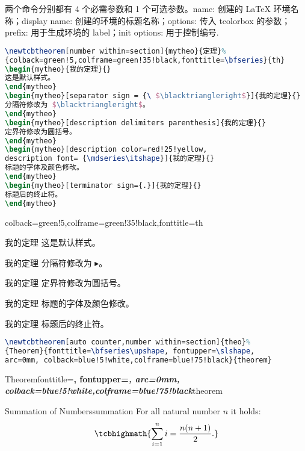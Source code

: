\documentclass{ctexart}
\begin{document}
两个命令分别都有 4 个必需参数和 1 个可选参数。name: 创建的 LaTeX 环境名称；display name: 创建的环境的标题名称；options: 传入 tcolorbox 的参数；prefix: 用于生成环境的 label；init options: 用于控制编号.
\begin{lstlisting}[language={TeX}]
\newtcbtheorem[number within=section]{mytheo}{定理}%
{colback=green!5,colframe=green!35!black,fonttitle=\bfseries}{th}
\begin{mytheo}{我的定理}{}
这是默认样式。
\end{mytheo}
\begin{mytheo}[separator sign = {\ $\blacktriangleright$}]{我的定理}{}
分隔符修改为 $\blacktriangleright$。
\end{mytheo}
\begin{mytheo}[description delimiters parenthesis]{我的定理}{}
定界符修改为圆括号。
\end{mytheo}
\begin{mytheo}[description color=red!25!yellow,
description font= {\mdseries\itshape}]{我的定理}{}
标题的字体及颜色修改。
\end{mytheo}
\begin{mytheo}[terminator sign={.}]{我的定理}{}
标题后的终止符。
\end{mytheo}
\end{lstlisting}
%
{colback=green!5,colframe=green!35!black,fonttitle=\bfseries}{th}
\begin{mytheo}{我的定理}{}
	这是默认样式。
\end{mytheo}
\begin{mytheo}[separator sign = {\ $\blacktriangleright$}]{我的定理}{}
	分隔符修改为 $\blacktriangleright$。
\end{mytheo}
\begin{mytheo}{我的定理}{}
	定界符修改为圆括号。
\end{mytheo}
\begin{mytheo}[description color=red!25!yellow,
	description font= {\mdseries\itshape}]{我的定理}{}
	标题的字体及颜色修改。
\end{mytheo}
\begin{mytheo}[terminator sign={.}]{我的定理}{}
	标题后的终止符。
\end{mytheo}
\begin{lstlisting}[language={TeX}]
\newtcbtheorem[auto counter,number within=section]{theo}%
{Theorem}{fonttitle=\bfseries\upshape, fontupper=\slshape,
arc=0mm, colback=blue!5!white,colframe=blue!75!black}{theorem}
\end{lstlisting}
%
{Theorem}{fonttitle=\bfseries\upshape, fontupper=\slshape,
	arc=0mm, colback=blue!5!white,colframe=blue!75!black}{theorem}
\begin{theo}{Summation of Numbers}{summation}
	For all natural number $n$ it holds:
	\begin{equation}
	\tcbhighmath{\sum\limits_{i=1}^n i = \frac{n(n+1)}{2}.}
	\end{equation}
\end{theo}
\end{document}

